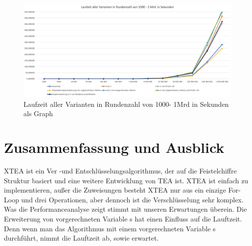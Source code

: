 \documentclass[course=asp]{aspdoc}
\begin{document}
\begin{figure}[h]
\centering
\includegraphics[scale = 0.4]{Analyse.png}
\caption{Laufzeit aller Varianten in Rundenzahl von 1000- 1Mrd in Sekunden als Graph}
\end{figure}
\newpage

\section{Zusammenfassung und Ausblick}
XTEA ist ein Ver -und Entschlüsselungsalgorithmus, der auf die Feistelchiffre Struktur basiert und eine weitere Entwicklung von TEA ist. XTEA ist einfach zu implementieren, außer die Zuweisungen besteht XTEA nur aus ein einzige For-Loop und drei Operationen, aber dennoch ist die Verschlüsselung sehr komplex. 
Was die Performanceanalyse zeigt stimmt mit unseren Erwartungen überein. Die Erweiterung von vorgerechneten Variable s hat einen Einfluss auf die Lauftzeit. Denn wenn man das Algorithmus mit einem vorgerechneten Variable s durchführt, nimmt die Lauftzeit ab, sowie erwartet.


\newpage


{}
\end{document}
